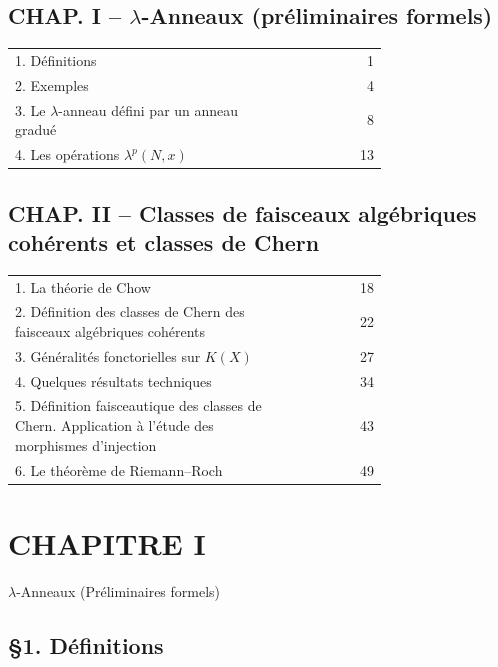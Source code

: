 \documentclass[11pt]{article}
\begin{document}
\subsection*{CHAP. I -- $\lambda$-Anneaux (préliminaires formels)}
\begin{longtable}{@{}p{0.74\linewidth}r@{}}
1. Définitions & 1\\
2. Exemples & 4\\
3. Le $\lambda$-anneau défini par un anneau gradué & 8\\
4. Les opérations $\lambda^p(N,x)$ & 13\\
\end{longtable}

\subsection*{CHAP. II -- Classes de faisceaux algébriques cohérents et classes de Chern}
\begin{longtable}{@{}p{0.74\linewidth}r@{}}
1. La théorie de Chow & 18\\
2. Définition des classes de Chern des faisceaux algébriques cohérents & 22\\
3. Généralités fonctorielles sur $K(X)$ & 27\\
4. Quelques résultats techniques & 34\\
5. Définition faisceautique des classes de Chern. Application à l'étude des morphismes d'injection & 43\\
6. Le théorème de Riemann--Roch & 49
\end{longtable}

\section*{CHAPITRE I}
\begin{center}
$\lambda$-Anneaux (Préliminaires formels)
\end{center}

\subsection*{\S 1. Définitions}
\end{document}
